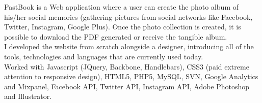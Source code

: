 \documentclass[11pt,a4paper]{moderncv-mod}
\begin{document}
{PastBook is a Web application where a user can create the photo album of his/her social memories (gathering pictures from social networks like Facebook, Twitter, Instagram, Google Plus). Once the photo collection is created, it is possible to download the PDF generated or receive the tangible album.\\
I developed the website from scratch alongside a designer, introducing all of the tools, technologies and languages that are currently used today.\\
Worked with Javascript (JQuery, Backbone, Handlebars), CSS3 (paid extreme attention to responsive design), HTML5, PHP5, MySQL, SVN, Google Analytics and Mixpanel, Facebook API, Twitter API, Instagram API, Adobe Photoshop and Illustrator. 
}
\end{document}
